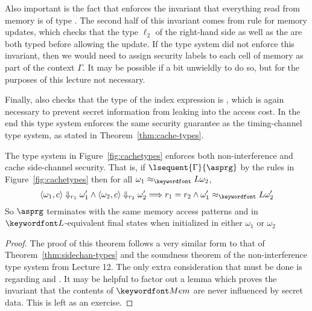 \documentclass[11pt,twoside]{scrartcl}
\begin{document}
Also important is the fact that  enforces the invariant that everything read from memory is of type \lowsec. The second half of this invariant comes from rule  for memory updates, which checks that the type $\ell_2$ of the right-hand side as well as the \pc are both typed \lowsec before allowing the update. If the type system did not enforce this invariant, then we would need to assign security labels to each cell of memory as part of the context $\Gamma$. It may be possible if a bit unwieldly to do so, but for the purposes of this lecture not necessary.

Finally,  also checks that the type of the index expression is \lowsec, which is again necessary to prevent secret information from leaking into the access cost. In the end this type system enforces the same security guarantee as the timing-channel type system, as stated in Theorem~\ref{thm:cache-types}.

\begin{theorem}
\label{thm:cache-types}
The type system in Figure~\ref{fig:cachetypes} enforces both non-interference and cache side-channel security. That is, if $\lsequent{\Gamma}{\asprg}$ by the rules in Figure~\ref{fig:cachetypes} then for all $\omega_1\approx_\lowt\omega_2$, 
\[
\langle \omega_1, c\rangle \Downarrow_{r_1} \omega_1' \land \langle\omega_2, c\rangle\Downarrow_{r_2}\omega_2' \Longrightarrow r_1 = r_2 \land \omega_1' \approx_\lowt \omega_2'
\]
So $\asprg$ terminates with the same memory access patterns and in $\lowsec$-equivalent final states when initialized in either $\omega_1$ or $\omega_2$
\end{theorem}
\begin{proof}
The proof of this theorem follows a very similar form to that of Theorem~\ref{thm:sidechan-types} and the soundness theorem of the non-interference type system from Lecture 12. The only extra consideration that must be done is regarding  and . It may be helpful to factor out a lemma which proves the invariant that the contents of $\pderefop$ are never influenced by secret data. This is left as an exercise.
\end{proof}



\end{document}
